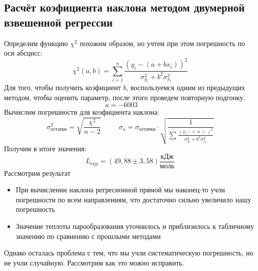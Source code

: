 \documentclass[a4paper,20pt]{article}
\theoremstyle{definition}
\begin{document}
\subsection{Расчёт коэфициента наклона методом двумерной взвешенной регрессии}
Определим функцию $\chi^2$ похожим образом, но учтем при этом погрешность по оси абсцисс:
\begin{equation}
	\chi^2(a, b) = \sum_{i=1}^{n} \frac{(y_i-(a+bx_i))^2}{\sigma^2_{y_i}+ b^2\sigma_{x_i}^2}
\end{equation}
Для того, чтобы получить коэфициент $b$, воспользуемся одним из предыдущих методом, чтобы оценить параметр, после этого проведем повторную подгонку.
\begin{equation}
	a = - 6003 \;\;\;\;\;\;\;\;\; 
\end{equation}
Вычислим погрешности для коэфициента наклона:
\begin{equation}
	\sigma_{\text{остатки}}^2 = \sqrt{\frac{\chi^2}{n-2}} \;\;\;\;\;\;\;\;\; \sigma_a = \sigma_{\text{остатки}}\cdot \sqrt{\frac{1}{\sum \frac{(x_i-<x>)^2}{\sigma^2_{y_i}+ b^2\sigma_{x_i}^2}}}
\end{equation}
Получим в итоге значения:
\begin{equation}
	L_{\text{exp}} = (49,88 \pm 3,58 ) \frac{\text{кДж}}{\text{моль}} 
\end{equation}
Рассмотрим результат
\begin{itemize}
	\item При вычислении наклона регресионной прямой мы наконец-то учли погрешности по всем направлениям, что достаточно сильно увеличило нашу погрешность
	\item Значение теплоты парообразования уточнилось и приблизилось к табличному значению по сравнению с прошлыми методами
\end{itemize}
Однако осталась проблема с тем, что мы учли систематическую погрешность, но не учли случайную. Рассмотрим как это можно исправить.
\end{document}
